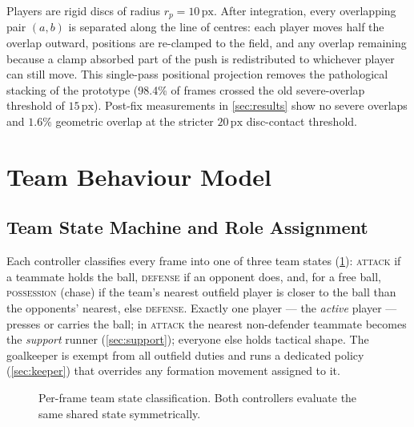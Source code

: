 \documentclass[10pt,twocolumn]{article}
\newcommand{\px}{\ensuremath{\,\mathrm{px}}}
\begin{document}
Players are rigid discs of radius $r_p = 10\px$. After integration, every
overlapping pair $(a,b)$ is separated along the line of centres: each
player moves half the overlap outward, positions are re-clamped to the
field, and any overlap remaining because a clamp absorbed part of the push
is redistributed to whichever player can still move. This single-pass
positional projection removes the pathological stacking of the prototype
(98.4\% of frames crossed the old severe-overlap threshold of $15\px$).
Post-fix measurements in \cref{sec:results} show no severe overlaps and
$1.6\%$ geometric overlap at the stricter $20\px$ disc-contact threshold.

\section{Team Behaviour Model}\label{sec:behaviour}

\subsection{Team State Machine and Role Assignment}\label{sec:states}

Each controller classifies every frame into one of three team states
(\cref{fig:states}): \textsc{attack} if a teammate holds the ball,
\textsc{defense} if an opponent does, and, for a free ball, \textsc{possession}
(chase) if the team's nearest outfield player is closer to the ball than
the opponents' nearest, else \textsc{defense}. Exactly one player --- the
\emph{active} player --- presses or carries the ball; in \textsc{attack} the
nearest non-defender teammate becomes the \emph{support} runner
(\cref{sec:support}); everyone else holds tactical shape. The goalkeeper is
exempt from all outfield duties and runs a dedicated policy
(\cref{sec:keeper}) that overrides any formation movement assigned to it.

\begin{figure}[t]
\centering
{}
\caption{Per-frame team state classification. Both controllers evaluate the
same shared state symmetrically.}
\label{fig:states}
\end{figure}
\end{document}
